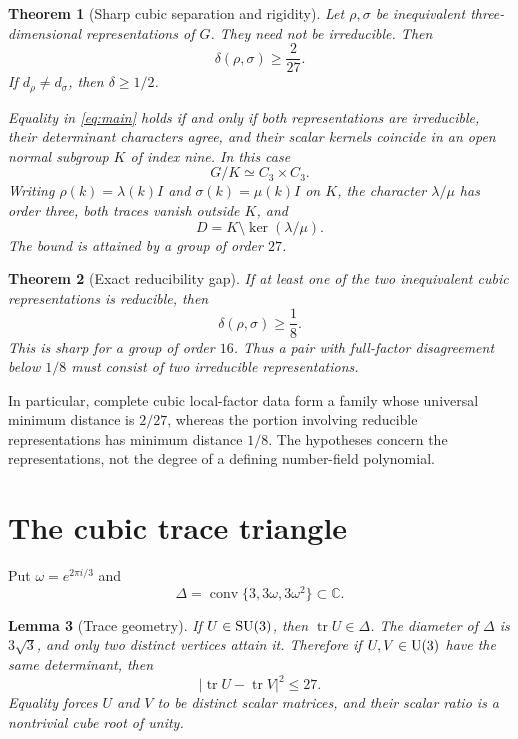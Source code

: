 \documentclass[11pt]{article}
\newtheorem{theorem}{Theorem}[section]
\newtheorem{lemma}[theorem]{Lemma}
\theoremstyle{definition}\newtheorem{definition}[theorem]{Definition}
\theoremstyle{remark}\newtheorem{remark}[theorem]{Remark}
\newcommand{\C}{\mathbb C}\newcommand{\Q}{\mathbb Q}\newcommand{\F}{\mathbb F}\newcommand{\Z}{\mathbb Z}
\newcommand{\tr}{\operatorname{tr}}\newcommand{\Gal}{\operatorname{Gal}}\newcommand{\diag}{\operatorname{diag}}
\begin{document}
\begin{theorem}[Sharp cubic separation and rigidity]\label{thm:main}
Let $\rho,\sigma$ be inequivalent three-dimensional representations of $G$. They need not be irreducible. Then
\begin{equation}\label{eq:main}
 \boxed{\delta(\rho,\sigma)\ge\frac{2}{27}.}
\end{equation}
If $d_\rho\ne d_\sigma$, then $\delta\ge1/2$.

Equality in \eqref{eq:main} holds if and only if both representations are irreducible, their determinant characters agree, and their scalar kernels coincide in an open normal subgroup $K$ of index nine. In this case
\[
 G/K\simeq C_3\times C_3.
\]
Writing $\rho(k)=\lambda(k)I$ and $\sigma(k)=\mu(k)I$ on $K$, the character $\lambda/\mu$ has order three, both traces vanish outside $K$, and
\begin{equation}\label{eq:equalityD}
 D=K\setminus\ker(\lambda/\mu).
\end{equation}
The bound is attained by a group of order $27$.
\end{theorem}

\begin{theorem}[Exact reducibility gap]\label{thm:reducible}
If at least one of the two inequivalent cubic representations is reducible, then
\begin{equation}\label{eq:reducible}
 \boxed{\delta(\rho,\sigma)\ge\frac18.}
\end{equation}
This is sharp for a group of order $16$. Thus a pair with full-factor disagreement below $1/8$ must consist of two irreducible representations.
\end{theorem}

In particular, complete cubic local-factor data form a family whose universal minimum distance is $2/27$, whereas the portion involving reducible representations has minimum distance $1/8$. The hypotheses concern the representations, not the degree of a defining number-field polynomial.

\section{The cubic trace triangle}

Put $\omega=e^{2\pi i/3}$ and
\[
 \Delta=\operatorname{conv}\{3,3\omega,3\omega^2\}\subset\C.
\]

\begin{lemma}[Trace geometry]\label{lem:triangle}
If $U\in\mathrm{SU}(3)$, then $\tr U\in\Delta$. The diameter of $\Delta$ is $3\sqrt3$, and only two distinct vertices attain it. Therefore if $U,V\in\mathrm U(3)$ have the same determinant, then
\begin{equation}\label{eq:27}
 |\tr U-\tr V|^2\le27.
\end{equation}
Equality forces $U$ and $V$ to be distinct scalar matrices, and their scalar ratio is a nontrivial cube root of unity.
\end{lemma}
\end{document}
